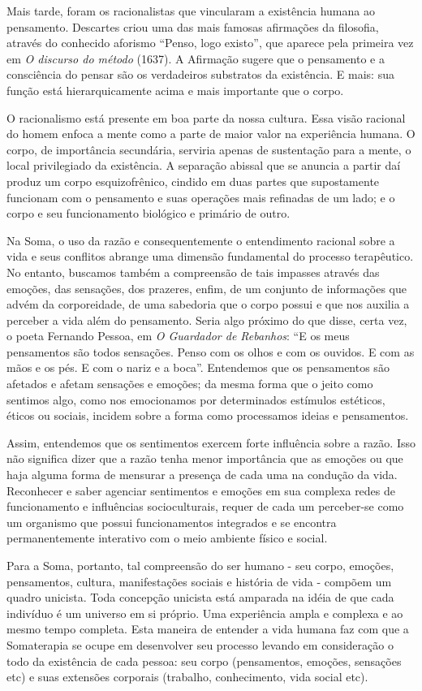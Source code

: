Mais tarde, foram os racionalistas que vincularam a existência humana ao
pensamento. Descartes criou uma das mais famosas afirmações da
filosofia, através do conhecido aforismo ``Penso, logo existo'', que
aparece pela primeira vez em \emph{O discurso do método} (1637). A
Afirmação sugere que o pensamento e a consciência do pensar são os
verdadeiros substratos da existência. E mais: sua função está
hierarquicamente acima e mais importante que o corpo.

O racionalismo está presente em boa parte da nossa cultura. Essa visão
racional do homem enfoca a mente como a parte de maior valor na
experiência humana. O corpo, de importância secundária, serviria apenas
de sustentação para a mente, o local privilegiado da existência. A
separação abissal que se anuncia a partir daí produz um corpo
esquizofrênico, cindido em duas partes que supostamente funcionam com o
pensamento e suas operações mais refinadas de um lado; e o corpo e seu
funcionamento biológico e primário de outro.

Na Soma, o uso da razão e consequentemente o entendimento racional sobre
a vida e seus conflitos abrange uma dimensão fundamental do processo
terapêutico. No entanto, buscamos também a compreensão de tais impasses
através das emoções, das sensações, dos prazeres, enfim, de um conjunto
de informações que advém da corporeidade, de uma sabedoria que o corpo
possui e que nos auxilia a perceber a vida além do pensamento. Seria
algo próximo do que disse, certa vez, o poeta Fernando Pessoa, em
\emph{O Guardador de Rebanhos}: ``E os meus pensamentos são todos
sensações. Penso com os olhos e com os ouvidos. E com as mãos e os pés.
E com o nariz e a boca''. Entendemos que os pensamentos são afetados e
afetam sensações e emoções; da mesma forma que o jeito como sentimos
algo, como nos emocionamos por determinados estímulos estéticos, éticos
ou sociais, incidem sobre a forma como processamos ideias e pensamentos.

Assim, entendemos que os sentimentos exercem forte influência sobre a
razão. Isso não significa dizer que a razão tenha menor importância que
as emoções ou que haja alguma forma de mensurar a presença de cada uma
na condução da vida. Reconhecer e saber agenciar sentimentos e emoções
em sua complexa redes de funcionamento e influências socioculturais,
requer de cada um perceber-se como um organismo que possui
funcionamentos integrados e se encontra permanentemente interativo com o
meio ambiente físico e social.

Para a Soma, portanto, tal compreensão do ser humano - seu corpo,
emoções, pensamentos, cultura, manifestações sociais e história de vida
- compõem um quadro unicista. Toda concepção unicista está amparada na
idéia de que cada indivíduo é um universo em si próprio. Uma experiência
ampla e complexa e ao mesmo tempo completa. Esta maneira de entender a
vida humana faz com que a Somaterapia se ocupe em desenvolver seu
processo levando em consideração o todo da existência de cada pessoa:
seu corpo (pensamentos, emoções, sensações etc) e suas extensões
corporais (trabalho, conhecimento, vida social etc).

